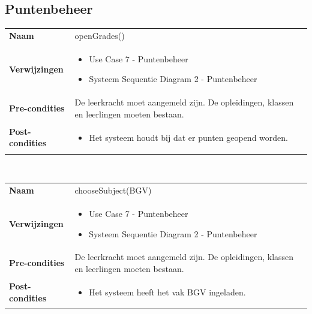 \documentclass[a4paper]{article}
\begin{document}
\subsection{Puntenbeheer}
\begin{tabularx}{\textwidth}{|l X|}
    \hline
    \textbf{Naam} & openGrades() \\
    \textbf{Verwijzingen} & \begin{itemize}[leftmargin=*]
        \item Use Case 7 - Puntenbeheer
        \item Systeem Sequentie Diagram 2 - Puntenbeheer
    \end{itemize}\\
    \textbf{Pre-condities} & De leerkracht moet aangemeld zijn. De opleidingen, klassen en leerlingen moeten bestaan.\\
    \textbf{Post-condities} & \begin{itemize}[leftmargin=*]
        \item Het systeem houdt bij dat er punten geopend worden.
    \end{itemize}\\
    \hline
\end{tabularx}\\

\begin{tabularx}{\textwidth}{|l X|}
    \hline
    \textbf{Naam} & chooseSubject(BGV) \\
    \textbf{Verwijzingen} & \begin{itemize}[leftmargin=*]
        \item Use Case 7 - Puntenbeheer
        \item Systeem Sequentie Diagram 2 - Puntenbeheer
    \end{itemize}\\
    \textbf{Pre-condities} & De leerkracht moet aangemeld zijn. De opleidingen, klassen en leerlingen moeten bestaan.\\
    \textbf{Post-condities} & \begin{itemize}[leftmargin=*]
        \item Het systeem heeft het vak BGV ingeladen.
    \end{itemize}\\
    \hline
\end{tabularx}\\
\end{document}
